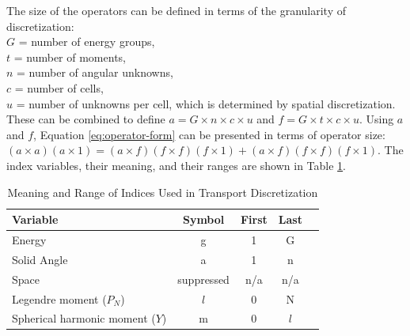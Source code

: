 \documentclass[12pt]{article}
\begin{document}
The size of the operators can be defined in terms of the granularity of discretization: \\
%
\indent $G$ = number of energy groups, \\
\indent $t$ = number of moments, \\
\indent $n$ = number of angular unknowns, \\
\indent $c$ = number of cells, \\
\indent $u$ = number of unknowns per cell, which is determined by spatial discretization. \\
%
These can be combined to define $a = G \times n \times c \times u$ and $f = G \times t \times c \times u$. Using $a$ and $f$, Equation \eqref{eq:operator-form} can be presented in terms of operator size: $(a \times a)(a \times 1) = (a \times f) (f \times f) (f \times 1) + (a \times f) (f \times f) (f \times 1)$. The index variables, their meaning, and their ranges are shown in Table \ref{table:index}. 
%
\begin{table}[!h]
\caption{Meaning and Range of Indices Used in Transport Discretization}
\begin{center}
\begin{tabular}{l c c c c}
\hline
Variable & Symbol & First & Last \\[0.5ex]
\hline
Energy & g & 1 & G \\
Solid Angle & a & 1 & n \\
Space & suppressed & n/a & n/a \\
Legendre moment ($P_{N}$) & $l$ & 0 & N \\
Spherical harmonic moment ($Y$) & m & 0 & $l$ \\
\hline
\end{tabular}
\end{center}
\label{table:index}
\end{table}
\end{document}
